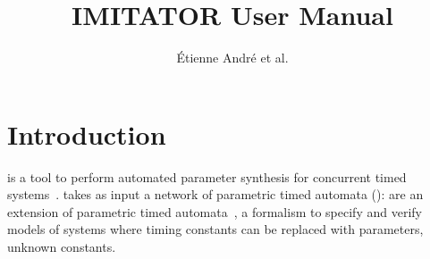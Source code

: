 
\newcommand{\titleOnHeader}{\textsf{IMITATOR} user manual}

\newcommand{\titleOnFirstPage}{IMITATOR User Manual}




\title{IMITATOR User Manual}
\author{Étienne André et al.}












\chapter{Introduction}

\imitator{} is a tool to perform automated parameter synthesis for concurrent timed systems~\cite{Andre21}.
\imitator{} takes as input a network of \imitator{} parametric timed automata (\NIPTA{}): \NIPTA{} are an extension of parametric timed automata~\cite{AHV93}, a formalism to specify and verify models of systems where timing constants can be replaced with parameters, \ie{} unknown constants.

